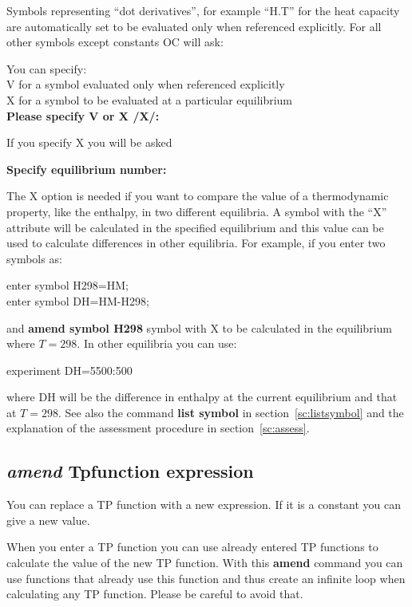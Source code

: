 \documentclass[11pt]{article}
\begin{document}
Symbols representing ``dot derivatives'', for example ``H.T'' for the
heat capacity are automatically set to be evaluated only when
referenced explicitly.  For all other symbols except constants OC will
ask:

\hypertarget{Amend symbol evaluated at equilib}{}
You can specify:\\
V for a symbol evaluated only when referenced explicitly\\
X for a symbol to be evaluated at a particular equilibrium\\
{\bf  Please specify V or X /X/:}

If you specify X you will be asked

{\bf Specify equilibrium number:}

The X option is needed if you want to compare the value of a
thermodynamic property, like the enthalpy, in two different
equilibria.  A symbol with the ``X'' attribute will be calculated in
the specified equilibrium and this value can be used
to calculate differences in other equilibria.  For example, if you
enter two symbols as:

\noindent
enter symbol H298=HM;\\
enter symbol DH=HM-H298;

\noindent
and {\bf amend symbol H298} symbol with X to be calculated in the
equilibrium where $T=298$.  In other equilibria you can use:

\noindent
experiment DH=5500:500

\noindent
where DH will be the difference in enthalpy at the current equilibrium
and that at $T=298$.  See also the command {\bf list symbol} in
section~\ref{sc:listsymbol} and the explanation of the assessment
procedure in section~\ref{sc:assess}.

\hypertarget{Amend TPfun}{}
\subsection{{\em amend} Tpfunction expression}

You can replace a TP function with a new expression.  If it is a
constant you can give a new value.

When you enter a TP function you can use already entered TP functions
to calculate the value of the new TP function.  With this {\bf amend}
command you can use functions that already use this function and thus
create an infinite loop when calculating any TP function.  Please be
careful to avoid that.
\end{document}

